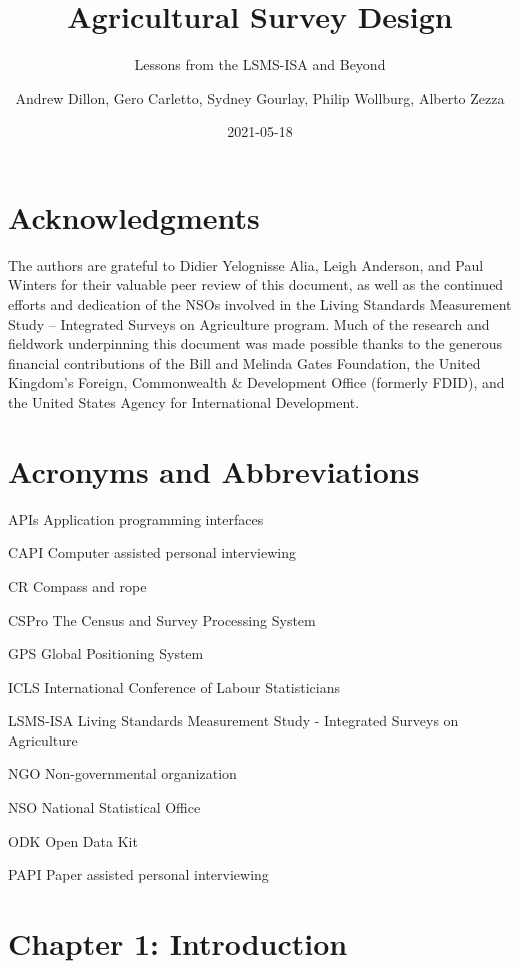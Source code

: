 \documentclass[
]{book}
\title{Agricultural Survey Design}
\subtitle{Lessons from the LSMS-ISA and Beyond}
\author{Andrew Dillon, Gero Carletto, Sydney Gourlay, Philip Wollburg, Alberto Zezza}
\date{2021-05-18}
\begin{document}
\maketitle

{
\setcounter{tocdepth}{1}
\tableofcontents
}
\hypertarget{acknowledgments}{%
\chapter*{Acknowledgments}\label{acknowledgments}}

The authors are grateful to Didier Yelognisse Alia, Leigh Anderson, and Paul Winters for their valuable peer review of this document, as well as the continued efforts and dedication of the NSOs involved in the Living Standards Measurement Study -- Integrated Surveys on Agriculture program. Much of the research and fieldwork underpinning this document was made possible thanks to the generous financial contributions of the Bill and Melinda Gates Foundation, the United Kingdom's Foreign, Commonwealth \& Development Office (formerly FDID), and the United States Agency for International Development.

\hypertarget{acronyms-and-abbreviations}{%
\chapter*{Acronyms and Abbreviations}\label{acronyms-and-abbreviations}}

APIs Application programming interfaces

CAPI Computer assisted personal interviewing

CR Compass and rope

CSPro The Census and Survey Processing System

GPS Global Positioning System

ICLS International Conference of Labour Statisticians

LSMS-ISA Living Standards Measurement Study - Integrated Surveys on Agriculture

NGO Non-governmental organization

NSO National Statistical Office

ODK Open Data Kit

PAPI Paper assisted personal interviewing

\hypertarget{chapter-1-introduction}{%
\chapter{Chapter 1: Introduction}\label{chapter-1-introduction}}
\end{document}

